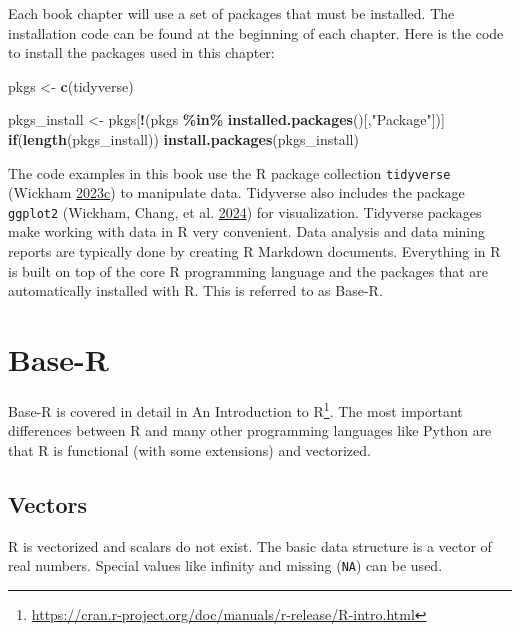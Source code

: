 \documentclass[
  notitlepage]{book}
\newenvironment{Shaded}{\begin{snugshade}}{\end{snugshade}}
\newcommand{\ControlFlowTok}[1]{\textcolor[rgb]{0.13,0.29,0.53}{\textbf{#1}}}
\newcommand{\KeywordTok}[1]{\textcolor[rgb]{0.13,0.29,0.53}{\textbf{#1}}}
\newcommand{\NormalTok}[1]{#1}
\newcommand{\OperatorTok}[1]{\textcolor[rgb]{0.81,0.36,0.00}{\textbf{#1}}}
\newcommand{\StringTok}[1]{\textcolor[rgb]{0.31,0.60,0.02}{#1}}
\DeclareRobustCommand{\href}[2]{#2\footnote{\url{#1}}}
\begin{document}
Each book chapter will use a set of packages that must be installed. The
installation code can be found at the beginning of each chapter. Here is
the code to install the packages used in this chapter:

\begin{Shaded}
\begin{Highlighting}[]
\NormalTok{pkgs \textless{}{-}}\StringTok{ }\KeywordTok{c}\NormalTok{(}\StringTok{\textquotesingle{}tidyverse\textquotesingle{}}\NormalTok{)}

\NormalTok{pkgs\_install \textless{}{-}}\StringTok{ }\NormalTok{pkgs[}\OperatorTok{!}\NormalTok{(pkgs }\OperatorTok{\%in\%}\StringTok{ }\KeywordTok{installed.packages}\NormalTok{()[,}\StringTok{"Package"}\NormalTok{])]}
\ControlFlowTok{if}\NormalTok{(}\KeywordTok{length}\NormalTok{(pkgs\_install)) }\KeywordTok{install.packages}\NormalTok{(pkgs\_install)}
\end{Highlighting}
\end{Shaded}

The code examples in this book use the R package collection \texttt{tidyverse}
(Wickham \protect\hyperlink{ref-R-tidyverse}{2023}\protect\hyperlink{ref-R-tidyverse}{c}) to manipulate data. Tidyverse also includes the package
\texttt{ggplot2} (Wickham, Chang, et al. \protect\hyperlink{ref-R-ggplot2}{2024}) for visualization. Tidyverse packages make
working with data in R very convenient. Data analysis and data mining
reports are typically done by creating
R Markdown documents. Everything in R is built on top of the
core R programming language and the packages that are automatically
installed with R. This is referred to as Base-R.

\hypertarget{base-r}{%
\section{Base-R}\label{base-r}}

Base-R is covered in detail in \href{https://cran.r-project.org/doc/manuals/r-release/R-intro.html}{An Introduction to
R}. The
most important differences between R and many other programming languages
like Python are that R is functional (with some extensions) and
vectorized.

\hypertarget{vectors}{%
\subsection{Vectors}\label{vectors}}

R is vectorized and scalars do not exist. The basic data structure is a
vector of real numbers. Special values like infinity and
missing (\texttt{NA}) can be used.
\end{document}
